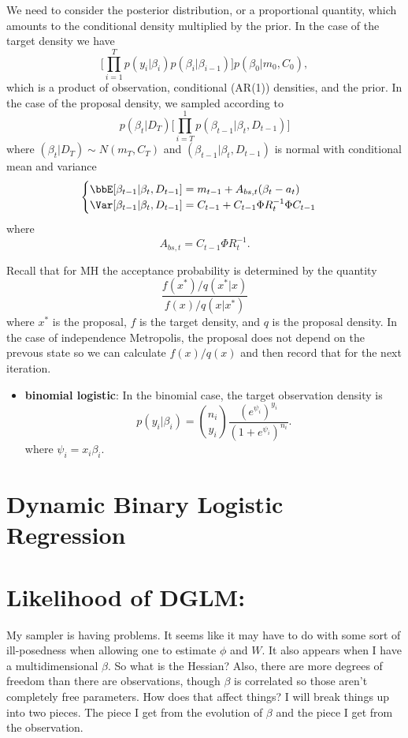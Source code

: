 \documentclass{article}
\begin{document}
We need to consider the posterior distribution, or a proportional quantity,
which amounts to the conditional density multiplied by the prior.  In the case
of the target density we have
\[
\Big[ \prod_{i=1}^T p(y_i | \beta_i) p(\beta_i | \beta_{i-1}) \Big] p(\beta_0 |
m_0, C_0),
\]
which is a product of observation, conditional (AR(1)) densities, and the prior.
In the case of the proposal density, we sampled according to
\[
p(\beta_t | D_T) \Big[ \prod_{i=T}^1 p(\beta_{t-1} | \beta_t, D_{t-1}) \Big]
\]
where $(\beta_t | D_T) \sim N(m_T, C_T)$ and $(\beta_{t-1} | \beta_t, D_{t-1})$
is normal with conditional mean and variance
\[
\begin{cases}
\bbE[\beta_{t-1} | \beta_t, D_{t-1}] = m_{t-1} + A_{bs,t} (\beta_t - a_t) \\
\Var[\beta_{t-1} | \beta_t, D_{t-1}] = C_{t-1} + C_{t-1} \Phi R_t^{-1} \Phi C_{t-1}
\end{cases}
\]
where
\[
A_{bs,t} = C_{t-1} \Phi R_t^{-1}.
\]

Recall that for MH the acceptance probability is determined by the quantity
\[
\frac
{f(x^*) / q(x^* | x)}
{f(x  ) / q(x | x^*)}
\]
where $x^*$ is the proposal, $f$ is the target density, and $q$ is the proposal
density.  In the case of independence Metropolis, the proposal does not depend
on the prevous state so we can calculate $f(x) / q(x)$ and then record that for
the next iteration.

\begin{itemize}

\item \textbf{binomial logistic}: In the binomial case, the target observation
  density is
  \[
  p(y_i | \beta_i) = {n_i \choose y_i} \frac{(e^{\psi_i})^{y_i}}{(1+e^{\psi_i})^{n_i}}.
  \]
  where $\psi_i = x_i \beta_i$.

\end{itemize}

\section{Dynamic Binary Logistic Regression}

\section{Likelihood of DGLM:}

My sampler is having problems.  It seems like it may have to do with some sort
of ill-posedness when allowing one to estimate $\phi$ and $W$.  It also appears
when I have a multidimensional $\beta$.  So what is the Hessian?  Also, there
are more degrees of freedom than there are observations, though $\beta$ is
correlated so those aren't completely free parameters.  How does that affect
things?  I will break things up into two pieces.  The piece I get from the
evolution of $\beta$ and the piece I get from the observation.
\end{document}
